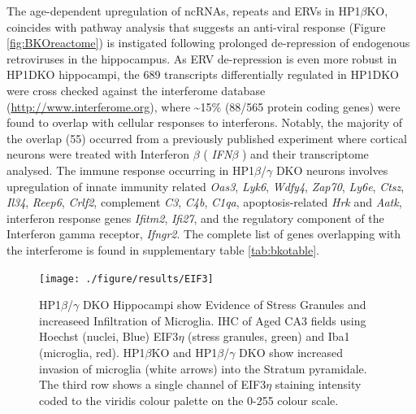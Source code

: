 \documentclass[onehalf,12pt]{beavtex}
\begin{document}
  The age-dependent upregulation of ncRNAs, repeats and ERVs in
  HP1\(\beta\)KO, coincides with pathway analysis that suggests an
  anti-viral response (Figure \ref{fig:BKOreactome}) is instigated
  following prolonged de-repression of endogenous retroviruses in the
  hippocampus. As ERV de-repression is even more robust in HP1DKO
  hippocampi, the 689 transcripts differentially regulated in HP1DKO were
  cross checked against the interferome database
  (\url{http://www.interferome.org}), where \textasciitilde{}15\% (88/565
  protein coding genes) were found to overlap with cellular responses to
  interferons. Notably, the majority of the overlap (55) occurred from a
  previously published experiment where cortical neurons were treated with
  Interferon \(\beta\) ( \emph{IFN\(\beta\)} ) and their transcriptome
  analysed. The immune response occurring in HP1\(\beta\)/\(\gamma\) DKO
  neurons involves upregulation of innate immunity related \emph{Oas3},
  \emph{Lyk6}, \emph{Wdfy4}, \emph{Zap70}, \emph{Ly6e}, \emph{Ctsz},
  \emph{Il34}, \emph{Reep6}, \emph{Crlf2}, complement \emph{C3},
  \emph{C4b}, \emph{C1qa}, apoptosis-related \emph{Hrk} and \emph{Aatk},
  interferon response genes \emph{Ifitm2}, \emph{Ifi27}, and the
  regulatory component of the Interferon gamma receptor, \emph{Ifngr2}.
  The complete list of genes overlapping with the interferome is found in
  supplementary table \ref{tab:bkotable}.
  
  \begin{figure}
  
  {\centering \texttt{[image: ./figure/results/EIF3]} 
  
  }
  
  \caption[HP1$\beta$/$\gamma$ DKO Hippocampi show Evidence of Stress Granules and increased Infiltration of Microglia]{HP1$\beta$/$\gamma$ DKO Hippocampi show Evidence of Stress Granules and increaseed Infiltration of Microglia. IHC of Aged CA3 fields using Hoechst (nuclei, Blue) EIF3$\eta$ (stress granules, green) and Iba1 (microglia, red).  HP1$\beta$KO and HP1$\beta$/$\gamma$ DKO show increased invasion of microglia (white arrows) into the Stratum pyramidale. The third row shows a single channel of EIF3$\eta$ staining intensity coded to the viridis colour palette on the 0-255 colour scale.}\label{fig:EIF3}
  \end{figure}
  
\end{document}
